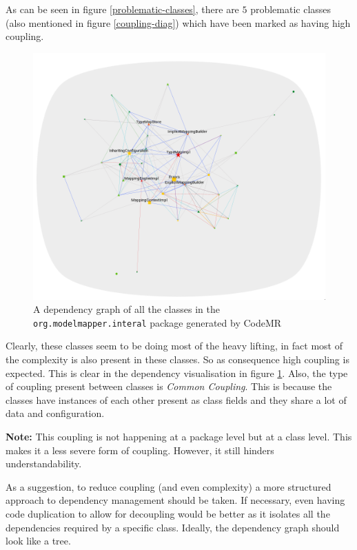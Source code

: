 \documentclass[12pt]{article}
\newcommand{\note}[1]{\textbf{Note:} #1}
\begin{document}
As can be seen in figure \ref{problematic-classes}, there are
$5$ problematic classes (also mentioned in figure
\ref{coupling-diag}) which have been marked as having high
coupling.

\begin{figure}[H]
    \centering
    \includegraphics[width=16cm]{images/internal-package-coupling.png}
    \caption{A dependency graph of all the classes in the
    \texttt{org.modelmapper.interal} package generated by
    CodeMR}
    \label{internal-package-coupling}
\end{figure}

Clearly, these classes seem to be doing most of the heavy
lifting, in fact most of the complexity is also present in these
classes. So as consequence high coupling is expected. This is
clear in the dependency visualisation in figure
\ref{internal-package-coupling}. Also, the type of coupling
present between classes is \emph{Common Coupling}. This is
because the classes have instances of each other present as
class fields and they share a lot of data and configuration.

\note{This coupling is not happening at a package level but at a
class level. This makes it a less severe form of coupling.
However, it still hinders understandability.}

As a suggestion, to reduce coupling (and even complexity) a more
structured approach to dependency management should be taken. If
necessary, even having code duplication to allow for decoupling
would be better as it isolates all the dependencies required by
a specific class. Ideally, the dependency graph should look like
a tree.
\end{document}
